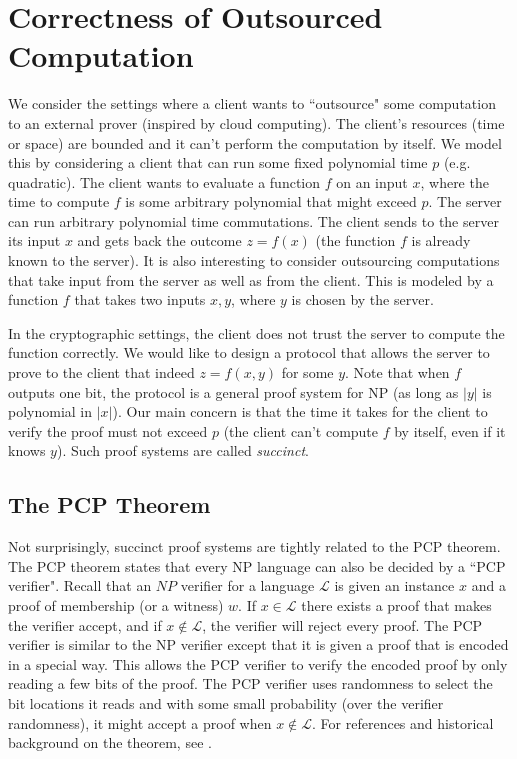 \documentclass{article}
\renewcommand{\L}{\mathcal{L}}
\begin{document}
\section{Correctness of Outsourced Computation}
We consider the settings where a client wants to ``outsource" some computation to an external prover (inspired by cloud computing). The client's resources (time or space) are bounded and it can't perform the computation by itself. We model this by considering a client that can run some fixed polynomial time $p$ (e.g. quadratic). The client wants to evaluate a function $f$ on an input $x$, where the time to compute $f$ is some arbitrary polynomial that might exceed $p$. The server can run arbitrary polynomial time commutations. The client sends to the server its input $x$ and gets back the outcome $z=f(x)$ (the function $f$ is already known to the server).
It is also interesting to consider outsourcing computations that take input from the server as well as from the client. This is modeled by a function $f$ that takes two inputs $x,y$, where $y$ is chosen by the server.

In the cryptographic settings, the client does not trust the server to compute the function correctly. We would like to design a protocol that allows the server to prove to the client that indeed $z=f(x,y)$ for some $y$. Note that when $f$ outputs one bit, the protocol is a general proof system for NP (as long as $|y|$ is polynomial in $|x|$). Our main concern is that the time it takes for the client to verify the proof must not exceed $p$ (the client can't compute $f$ by itself, even if it knows $y$). Such proof systems are called {\em succinct}.

\subsection{The PCP Theorem}
Not surprisingly, succinct proof systems are tightly related to the PCP theorem.
The PCP theorem states that every NP language can also be decided by a ``PCP verifier". Recall that an $NP$ verifier for a language $\L$ is given an instance $x$ and a proof of membership (or a witness) $w$. If $x \in \L$ there exists a proof that makes the verifier accept, and if $x \notin \L$, the verifier will reject every proof. The PCP verifier is similar to the NP verifier except that it is given a proof that is encoded in a special way. This allows the PCP verifier to verify the encoded proof by only reading a few bits of the proof. The PCP verifier uses randomness to select the bit locations it reads and with some small probability (over the verifier randomness), it might accept a proof when $x \notin \L$. For references and historical background on the theorem, see \cite{Dinur07}.
\end{document}
